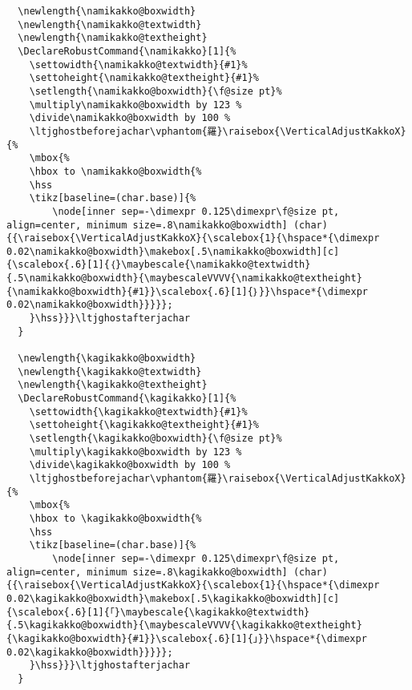 \documentclass[luatex,fontsize=10pt,paper=b5,twoside]{jlreq}%
\begin{document}
\begin{lstlisting}
  \newlength{\namikakko@boxwidth}
  \newlength{\namikakko@textwidth}
  \newlength{\namikakko@textheight}
  \DeclareRobustCommand{\namikakko}[1]{%
    \settowidth{\namikakko@textwidth}{#1}%
    \settoheight{\namikakko@textheight}{#1}%
    \setlength{\namikakko@boxwidth}{\f@size pt}%
    \multiply\namikakko@boxwidth by 123 %
    \divide\namikakko@boxwidth by 100 %
    \ltjghostbeforejachar\vphantom{羅}\raisebox{\VerticalAdjustKakkoX}{%
    \mbox{%
    \hbox to \namikakko@boxwidth{%
    \hss
    \tikz[baseline=(char.base)]{%
        \node[inner sep=-\dimexpr 0.125\dimexpr\f@size pt, align=center, minimum size=.8\namikakko@boxwidth] (char) {{\raisebox{\VerticalAdjustKakkoX}{\scalebox{1}{\hspace*{\dimexpr 0.02\namikakko@boxwidth}\makebox[.5\namikakko@boxwidth][c]{\scalebox{.6}[1]{｛}\maybescale{\namikakko@textwidth}{.5\namikakko@boxwidth}{\maybescaleVVVV{\namikakko@textheight}{\namikakko@boxwidth}{#1}}\scalebox{.6}[1]{｝}}\hspace*{\dimexpr 0.02\namikakko@boxwidth}}}}};
    }\hss}}}\ltjghostafterjachar
  }

  \newlength{\kagikakko@boxwidth}
  \newlength{\kagikakko@textwidth}
  \newlength{\kagikakko@textheight}
  \DeclareRobustCommand{\kagikakko}[1]{%
    \settowidth{\kagikakko@textwidth}{#1}%
    \settoheight{\kagikakko@textheight}{#1}%
    \setlength{\kagikakko@boxwidth}{\f@size pt}%
    \multiply\kagikakko@boxwidth by 123 %
    \divide\kagikakko@boxwidth by 100 %
    \ltjghostbeforejachar\vphantom{羅}\raisebox{\VerticalAdjustKakkoX}{%
    \mbox{%
    \hbox to \kagikakko@boxwidth{%
    \hss
    \tikz[baseline=(char.base)]{%
        \node[inner sep=-\dimexpr 0.125\dimexpr\f@size pt, align=center, minimum size=.8\kagikakko@boxwidth] (char) {{\raisebox{\VerticalAdjustKakkoX}{\scalebox{1}{\hspace*{\dimexpr 0.02\kagikakko@boxwidth}\makebox[.5\kagikakko@boxwidth][c]{\scalebox{.6}[1]{「}\maybescale{\kagikakko@textwidth}{.5\kagikakko@boxwidth}{\maybescaleVVVV{\kagikakko@textheight}{\kagikakko@boxwidth}{#1}}\scalebox{.6}[1]{」}}\hspace*{\dimexpr 0.02\kagikakko@boxwidth}}}}};
    }\hss}}}\ltjghostafterjachar
  }


\end{lstlisting}
\end{document}
